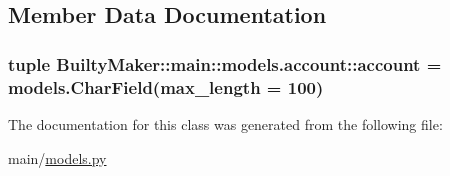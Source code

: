 \subsection{\-Member \-Data \-Documentation}
\hypertarget{classBuiltyMaker_1_1main_1_1models_1_1account_ae639275db15bc1fcdb7bb73564638128}{
\subsubsection[{account}]{\setlength{\rightskip}{0pt plus 5cm}tuple {\bf \-Builty\-Maker\-::main\-::models.\-account\-::account} = models.\-Char\-Field(max\-\_\-length = 100)}}\label{classBuiltyMaker_1_1main_1_1models_1_1account_ae639275db15bc1fcdb7bb73564638128}


\-The documentation for this class was generated from the following file\-:\begin{DoxyCompactItemize}
\item 
main/\hyperlink{models_8py}{models.\-py}\end{DoxyCompactItemize}
